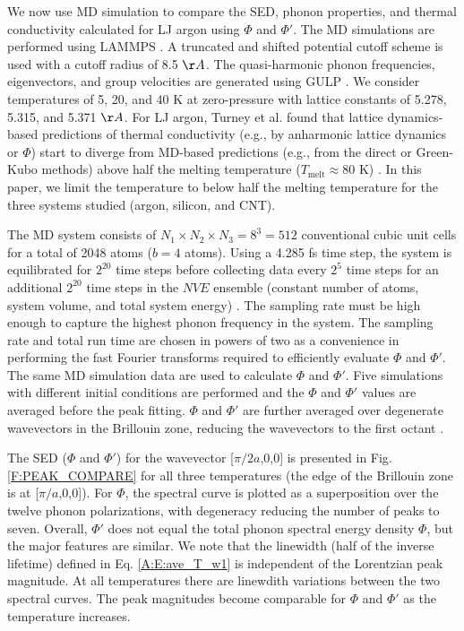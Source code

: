 \documentclass[12pt,twocolumn,iop]{/usr/share/texmf-texlive/tex/latex/iop/iopart}[/usr/share/texmf-texlive/tex/latex/iop/]
\begin{document}
We now use MD simulation to compare the SED, phonon properties, and thermal conductivity calculated for LJ argon using $\Phi$ and $\Phi'$. The MD simulations are performed using LAMMPS \cite{LAMMPS}. A truncated and shifted
potential cutoff scheme is used with a cutoff radius of 8.5 $\AA$. The quasi-harmonic phonon frequencies, eigenvectors, and group velocities are generated using GULP \cite{GULP}. We consider temperatures of 5, 20, and 40 K at zero-pressure with lattice constants of 5.278, 5.315, and 5.371 $\AA$. For LJ argon, Turney et al. found that lattice dynamics-based predictions of thermal conductivity (e.g., by anharmonic lattice dynamics or $\Phi$) start to diverge from MD-based predictions (e.g., from the direct or Green-Kubo methods) above half the melting temperature ($T_{\mathrm{melt}} \approx 80$ K) \cite{turney2009a}. In this paper, we limit the temperature to below half the melting temperature for the three systems studied (argon, silicon, and CNT).

The MD system consists of $N_1 \times N_2 \times N_3 = 8^3 = 512$ conventional cubic unit cells for a total of 2048 atoms ($b=4$ atoms). Using a 4.285 fs time step, the system is equilibrated for $2^{20}$ time steps before collecting data every $2^5$ time steps for an additional $2^{20}$ time steps in the $NVE$ ensemble (constant number of atoms, system volume, and total system energy) \cite{mcquarrie2000}. The sampling rate must be high enough to capture the highest phonon frequency in the system. The sampling rate and total run time are chosen in powers of two as a convenience in performing the fast Fourier transforms required to efficiently evaluate $\Phi$ and $\Phi'$. The same MD simulation data are used to calculate $\Phi$ and $\Phi'$.  Five simulations with different initial conditions are performed and the $\Phi$ and $\Phi'$ values are averaged before the peak fitting. $\Phi$ and $\Phi'$ are further averaged over degenerate wavevectors in the Brillouin zone, reducing the wavevectors to the first octant \cite{mcgaugheythesis}.

The SED ($\Phi$ and $\Phi'$) for the wavevector [$\pi/2a$,0,0] is presented in Fig$.$ \ref{F:PEAK_COMPARE} for all three temperatures (the edge of the Brillouin zone is at [$\pi/a$,0,0]).  For $\Phi$, the spectral curve is plotted as a superposition over the twelve phonon polarizations, with degeneracy reducing the number of peaks to seven.  Overall, $\Phi'$ does not equal the total phonon spectral energy density $\Phi$, but the major features are similar. We note that the linewidth (half of the inverse lifetime) defined in Eq$.$ \eqref{A:E:ave_T_w1} is independent of the Lorentzian peak magnitude. At all temperatures there are linewdith variations between the two spectral curves. The peak magnitudes become comparable for $\Phi$ and $\Phi'$ as the temperature increases.
\end{document}

